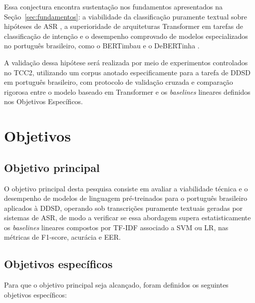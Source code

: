 \documentclass[
    12pt,                %
    openright,           %
    oneside,             %
    a4paper,             %
    english,             %
    brazil               %
]{abntex2}
\begin{document}
Essa conjectura encontra sustentação nos fundamentos apresentados na Seção~\ref{sec:fundamentos}: a viabilidade da classificação puramente textual sobre hipóteses de ASR \cite{Wagner2024}, a superioridade de arquiteturas Transformer em tarefas de classificação de intenção \cite{Weld2022} e o desempenho comprovado de modelos especializados no português brasileiro, como o BERTimbau \cite{Souza2020} e o DeBERTinha \cite{Abonizio2023}. 

A validação dessa hipótese será realizada por meio de experimentos controlados no TCC2, utilizando um corpus anotado especificamente para a tarefa de DDSD em português brasileiro, com protocolo de validação cruzada e comparação rigorosa entre o modelo baseado em Transformer e os \textit{baselines} lineares definidos nos Objetivos Específicos.

\section{Objetivos}
\label{sec:objetivos}

\subsection{Objetivo principal}

O objetivo principal desta pesquisa consiste em avaliar a viabilidade técnica e o desempenho de modelos de linguagem pré-treinados para o português brasileiro aplicados à DDSD, operando sob transcrições puramente textuais geradas por sistemas de ASR, de modo a verificar se essa abordagem supera estatisticamente os \textit{baselines} lineares compostos por TF-IDF associado a SVM ou LR, nas métricas de F1-score, acurácia e EER.

\subsection{Objetivos específicos}

Para que o objetivo principal seja alcançado, foram definidos os seguintes objetivos específicos:
\end{document}

